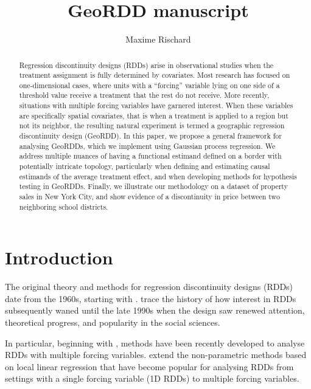 \documentclass[letter]{article}
\title{GeoRDD manuscript}
\author{Maxime Rischard}
\renewcommand{\cite}[1]{\citet{#1}}
\begin{document}
    
    
    \maketitle
    
    

    




\begin{abstract}
    	Regression discontinuity designs (RDDs) arise in observational studies when the treatment assignment is fully determined by covariates.
Most research has focused on one-dimensional cases, where units with a ``forcing'' variable lying on one side of a threshold value receive a treatment that the rest do not receive.
More recently, situations with multiple forcing variables have garnered interest.
When these variables are specifically spatial covariates, that is when a treatment is applied to a region but not its neighbor, the resulting natural experiment is termed a geographic regression discontinuity design (GeoRDD).
In this paper, we propose a general framework for analysing GeoRDDs, which we implement using Gaussian process regression.
We address multiple nuances of having a functional estimand defined on a border with potentially intricate topology, particularly when defining and estimating causal estimands of the average treatment effect, and when developing methods for hypothesis testing in GeoRDDs.
Finally, we illustrate our methodology on a dataset of property sales in New York City,
and show evidence of a discontinuity in price between two neighboring school districts.
    

\end{abstract}
    	\section{Introduction}\label{introduction}
    


    	The original theory and methods for regression discontinuity designs (RDDs) date from the 1960s, starting with \cite{thistlethwaite1960regression}.
\cite{cook2008waiting} trace the history of how interest in RDDs subsequently waned until the late 1990s when the design saw renewed attention, theoretical progress, and popularity in the social sciences.

In particular, beginning with \cite{papay2011extending}, methods have been recently developed to analyse RDDs with multiple forcing variables.
\cite{imbens2011regression} extend the non-parametric methods based on local linear regression that have become popular for analysing RDDs \citep[see][]{imbensrdd} from settings with a single forcing variable (1D RDDs) to multiple forcing variables.
    
\end{document}
